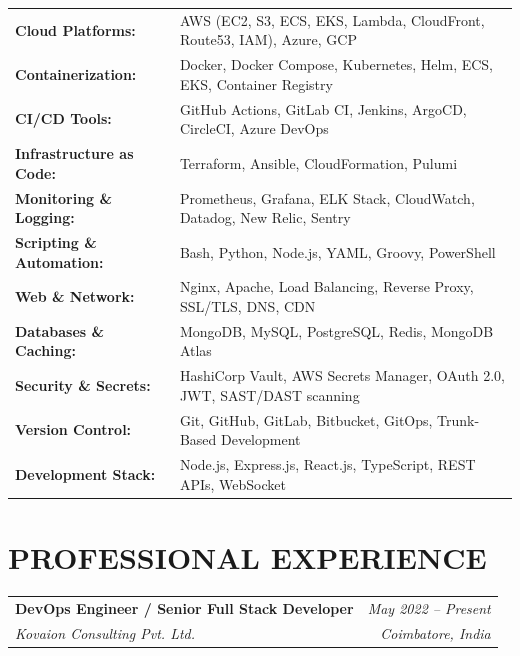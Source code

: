 \documentclass[11pt]{article}
\makeatletter
\newcommand{\resumeSubheading}[4]{
    \vspace{0.5pt}
    \begin{tabularx}{\textwidth}{@{}X r@{}}
        \textbf{\color{textgray}#1} & \color{textgray}\textit{#2} \\
        \textit{#3} & \textit{#4}
    \end{tabularx}
    \vspace{0.5pt}
}
\makeatother
\begin{document}
\vspace{2pt}
\begin{tabular}{@{} l l @{}}
    \textbf{Cloud Platforms:} & AWS (EC2, S3, ECS, EKS, Lambda, CloudFront, Route53, IAM), Azure, GCP \\[3pt]
    \textbf{Containerization:} & Docker, Docker Compose, Kubernetes, Helm, ECS, EKS, Container Registry \\[3pt]
    \textbf{CI/CD Tools:} & GitHub Actions, GitLab CI, Jenkins, ArgoCD, CircleCI, Azure DevOps \\[3pt]
    \textbf{Infrastructure as Code:} & Terraform, Ansible, CloudFormation, Pulumi \\[3pt]
    \textbf{Monitoring \& Logging:} & Prometheus, Grafana, ELK Stack, CloudWatch, Datadog, New Relic, Sentry \\[3pt]
    \textbf{Scripting \& Automation:} & Bash, Python, Node.js, YAML, Groovy, PowerShell \\[3pt]
    \textbf{Web \& Network:} & Nginx, Apache, Load Balancing, Reverse Proxy, SSL/TLS, DNS, CDN \\[3pt]
    \textbf{Databases \& Caching:} & MongoDB, MySQL, PostgreSQL, Redis, MongoDB Atlas \\[3pt]
    \textbf{Security \& Secrets:} & HashiCorp Vault, AWS Secrets Manager, OAuth 2.0, JWT, SAST/DAST scanning \\[3pt]
    \textbf{Version Control:} & Git, GitHub, GitLab, Bitbucket, GitOps, Trunk-Based Development \\[3pt]
    \textbf{Development Stack:} & Node.js, Express.js, React.js, TypeScript, REST APIs, WebSocket
\end{tabular}

\section*{PROFESSIONAL EXPERIENCE}

\resumeSubheading
    {DevOps Engineer / Senior Full Stack Developer}{May 2022 -- Present}
    {Kovaion Consulting Pvt. Ltd.}{Coimbatore, India}
\end{document}
